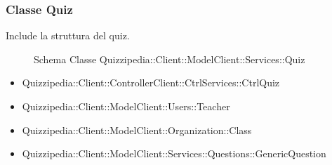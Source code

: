 \subsubsection{Classe Quiz}
Include la struttura del quiz.
\begin{figure}[H]
\centering
\noindent{}
\caption[Schema Classe Quiz]{Schema Classe Quizzipedia::Client::ModelClient::Services::Quiz}
\end{figure}
\begin{itemize}
\item Quizzipedia::Client::ControllerClient::CtrlServices::CtrlQuiz
\item Quizzipedia::Client::ModelClient::Users::Teacher
\end{itemize}
\begin{itemize}
\item Quizzipedia::Client::ModelClient::Organization::Class
\item Quizzipedia::Client::ModelClient::Services::Questions::GenericQuestion
\end{itemize}
